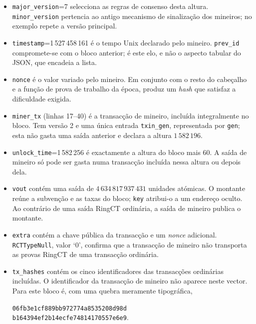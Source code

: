 \begin{appendices}
\begin{itemize}
 \item {\tt major\_version}=7 selecciona as regras de consenso desta altura.
 {\tt minor\_version} pertencia ao antigo mecanismo de sinalização dos
 mineiros; no exemplo repete a versão principal.

 \item {\tt timestamp}=1\,527\,458\,161 é o tempo Unix declarado pelo
 mineiro. {\tt prev\_id} compromete-se com o bloco anterior; é este elo, e não
 o aspecto tabular do JSON, que encadeia a lista.

 \item {\tt nonce} é o valor variado pelo mineiro. Em conjunto com o resto do
 cabeçalho e a função de prova de trabalho da época, produz um \emph{hash} que
 satisfaz a dificuldade exigida.

 \item {\tt miner\_tx} (linhas 17--40) é a transacção de mineiro, incluída
 integralmente no bloco. Tem versão 2 e uma única entrada {\tt txin\_gen},
 representada por {\tt gen}; esta não gasta uma saída anterior e declara a
 altura \(1\,582\,196\).

 \item {\tt unlock\_time}=1\,582\,256 é exactamente a altura do bloco mais
 60. A saída de mineiro só pode ser gasta numa transacção incluída nessa
 altura ou depois dela.

 \item {\tt vout} contém uma saída de
 \(4\,634\,817\,937\,431\) unidades atómicas. O montante reúne a subvenção e
 as taxas do bloco; {\tt key} atribui-o a um endereço oculto. Ao contrário de
 uma saída RingCT ordinária, a saída de mineiro publica o montante.

 \item {\tt extra} contém a chave pública da transacção e um \emph{nonce}
 adicional. {\tt RCTTypeNull}, valor `0', confirma que a transacção de mineiro
 não transporta as provas RingCT de uma transacção ordinária.

 \item {\tt tx\_hashes} contém os cinco identificadores das transacções
 ordinárias incluídas. O identificador da transacção de mineiro não aparece
 neste vector. Para este bloco é, com uma quebra meramente tipográfica,
 \begin{center}
  {\tt 06fb3e1cf889bb972774a8535208d98d}\\
  {\tt b164394ef2b14ecfe74814170557e6e9}.
 \end{center}
\end{itemize}


\end{appendices}
